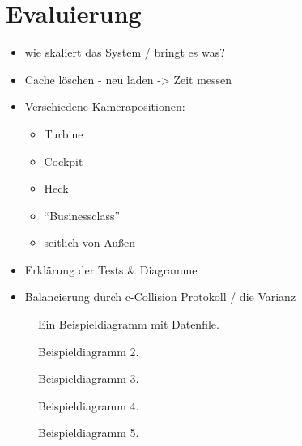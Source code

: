\chapter{Evaluierung}
\label{chap:eval}
%
\begin{itemize}
 \item wie skaliert das System / bringt es was?
 \item Cache löschen - neu laden -> Zeit messen
 \item Verschiedene Kamerapositionen:
 \begin{itemize}
  \item Turbine
  \item Cockpit
  \item Heck
  \item ``Businessclass''
  \item seitlich von Außen
 \end{itemize}
 \item Erklärung der Tests \& Diagramme
 \item Balancierung durch c-Collision Protokoll / die Varianz
\end{itemize}
%




\begin{figure}
\centering

  \caption{Ein Beispieldiagramm mit Datenfile.}
  \label{fig:eval:diag1}
\end{figure}

\begin{figure}
\centering

  \caption{Beispieldiagramm 2.}
  \label{fig:eval:diag2}
\end{figure}

\begin{figure}
\centering

  \caption{Beispieldiagramm 3.}
  \label{fig:eval:diag3}
\end{figure}

\begin{figure}
\centering

  \caption{Beispieldiagramm 4.}
  \label{fig:eval:diag4}
\end{figure}

\begin{figure}
  \centering
  
  \caption{Beispieldiagramm 5. }
  \label{fig:eval:diag5}
\end{figure}
